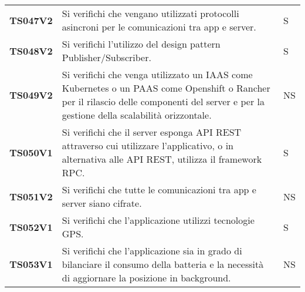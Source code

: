\documentclass[../../piano-di-qualifica.tex]{subfiles}
\begin{document}
\begin{longtable}[H]{>{\centering\bfseries}m{3cm} >{}m{10cm} >{\centering\arraybackslash}m{3cm}}
  TS047V2            & Si verifichi che vengano utilizzati protocolli asincroni per le comunicazioni tra app e server.
                     & S                                                                                                                                                                                                                                                   \\

  TS048V2            & Si verifichi l'utilizzo del design pattern Publisher/Subscriber.
                     & S                                                                                                                                                                                                                                                   \\

  TS049V2            & Si verifichi che venga utilizzato un IAAS come Kubernetes o un PAAS come Openshift o Rancher per il rilascio delle componenti del server e per la gestione della scalabilità orizzontale.
                     & NS
  \\
  TS050V1            & Si verifichi che il server esponga API REST attraverso cui utilizzare l'applicativo, o in alternativa alle API REST, utilizza il framework RPC\@.
                     & S                                                                                                                                                                                                                                                   \\

  TS051V2            & Si verifichi che tutte le comunicazioni tra app e server siano cifrate.
                     & NS                                                                                                                                                                                                                                                  \\

  TS052V1            & Si verifichi che l'applicazione utilizzi tecnologie GPS\@.
                     & S                                                                                                                                                                                                                                                   \\

  TS053V1            & Si verifichi che l'applicazione sia in grado di bilanciare il consumo della batteria e la necessità di aggiornare la posizione in background.
                     & NS                                                                                                                                                                                                                                                  \\


\end{longtable}
\end{document}
